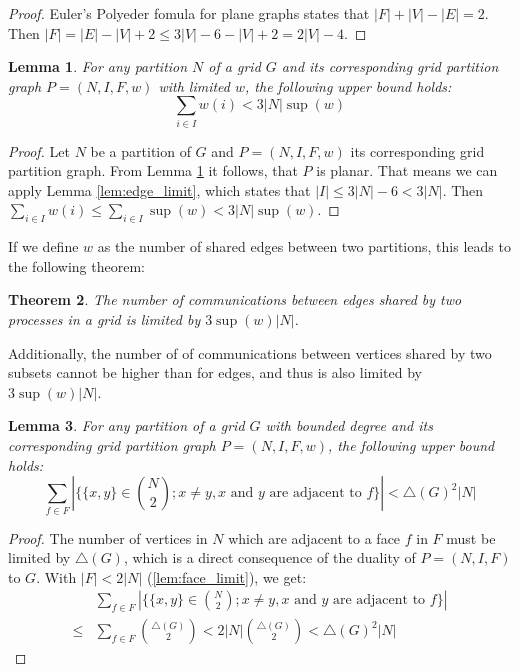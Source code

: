\documentclass{IOS-Book-Article}
\theoremstyle{plain}
\newtheorem{theorem}{Theorem}[section]
\newtheorem{lemma}[theorem]{Lemma}
\theoremstyle{definition}
\begin{document}
\begin{proof}
	Euler's Polyeder fomula for plane graphs states that $|F| + |V| - |E| = 2$. Then $|F| = |E| - |V| + 2 \leq 3 |V| - 6 - |V| + 2 = 2 |V| - 4$.
\end{proof}

\begin{lemma}
	\label{lem:edge_part}
	For any partition $N$ of a grid $G$ and its corresponding grid partition graph $P = (N, I, F, w)$ with limited $w$, the following upper bound holds:
	$$\sum\limits_{i \in I} w(i) < 3 |N| \sup(w) $$
\end{lemma}

\begin{proof}
	Let $N$ be a partition of $G$ and $P = (N, I, F, w)$ its corresponding grid partition graph. From Lemma \ref{lem:edge_part} it follows, that $P$ is planar. That means we can apply Lemma \ref{lem:edge_limit}, which states that $|I| \leq 3 |N| - 6 < 3 |N|$. Then $\sum\limits_{i \in I} w(i) \leq \sum\limits_{i \in I} \sup(w) < 3 |N| \sup(w)$.
\end{proof}

If we define $w$ as the number of shared edges between two partitions, this leads to the following theorem:

\begin{theorem}
	 The number of communications between edges shared by two processes in a grid is limited by $3 \sup(w) |N|$.
\end{theorem}

Additionally, the number of of communications between vertices shared by two subsets cannot be higher than for edges, and thus is also limited by $3 \sup(w) |N|$.

\begin{lemma}
	\label{lem:vertex_part}
	For any partition of a grid $G$ with bounded degree and its corresponding grid partition graph $P = (N, I, F, w)$, the following upper bound holds:
	$$\sum\limits_{f \in F} |\{ \{ x, y \} \in {N \choose 2}; x \neq y, x \text{ and } y \text{ are adjacent to } f\}| < \bigtriangleup(G)^2 |N|$$
\end{lemma}

\begin{proof}
		The number of vertices in $N$ which are adjacent to a face $f$ in $F$ must be limited by $\bigtriangleup(G)$, which is a direct consequence of the duality of $P = (N, I, F)$ to $G$. With $|F| < 2 |N|$ (\ref{lem:face_limit}), we get:
\begin{align*}
& \sum\limits_{f \in F} |\{ \{ x, y \} \in {N \choose 2}; x \neq y, x \text{ and } y \text{ are adjacent to } f\}| \\
\leq & \sum\limits_{f \in F} {\bigtriangleup(G) \choose 2} < 2 |N| {\bigtriangleup(G) \choose 2} < \bigtriangleup(G)^2 |N|
\end{align*}
\end{proof}
\end{document}
